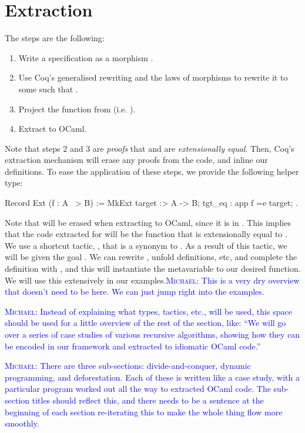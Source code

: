 \documentclass[ a4paper, UKenglish, cleveref, autoref, thm-restate]{lipics-v2021}
\newcommand{\mvol}[1]{\textcolor{blue}{\textsc{Michael}: #1}}
\begin{document}
\section{Extraction}
The steps are the following:
\begin{enumerate}
  \item Write a specification as a morphism .
  \item Use Coq's generalised rewriting and the laws of morphisms to 
    rewrite it to some  such that .
  \item Project the function  from 
    (i.e. ).
  \item Extract  to OCaml.
\end{enumerate}
Note that steps 2 and 3 are \emph{proofs} that  and  are
\emph{extensionally equal}. Then, Coq's extraction mechanism will erase any
proofs from the code, and inline our definitions. To ease the application of
these steps, we provide the following helper type:
\begin{coqcode}
  Record Ext (f : A ~> B) := 
    MkExt { target :> A -> B; tgt_eq : app f =e target; }.
\end{coqcode}
Note that  will be erased when extracting  to OCaml,
since it is in . This implies that the code extracted for 
will be the function  that is extensionally equal to .  We
use a shortcut tactic, , that is a synonym to 
. As a result of this tactic, we will be given the goal 
. We can rewrite , unfold definitions, etc, and
complete the definition with , and this will instantiate the
metavariable  to our desired function. We will use this extensively
in our examples.\mvol{This is a very dry overview that doesn't need to be here. We can just jump
  right into the examples.}

\mvol{Instead of explaining what types, tactics, etc., will be used, this space should
  be used for a little overview of the rest of the section, like: ``We will go over a series
  of case studies of various recursive algorithms, showing how they can be encoded
  in our framework and extracted to idiomatic OCaml code.''}

\mvol{There are three sub-sections: divide-and-conquer, dynamic programming, and deforestation.
  Each of these is written like a case study, with a particular program worked out all the way
  to extracted OCaml code. The sub-section titles should reflect this, and there needs to be
  a sentence at the beginning of each section re-iterating this to make the whole thing
  flow more smoothly.}
\end{document}
